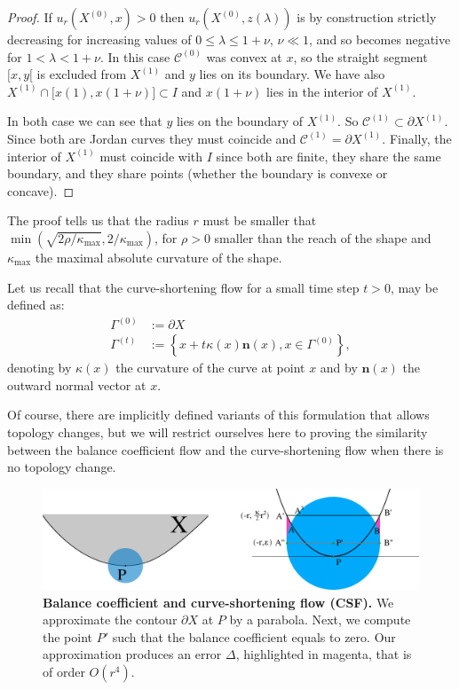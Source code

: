 \documentclass{siamart220329}
\newcommand{\C}{\mathcal{C}} %
\begin{document}
\begin{proof}
  If $u_r(X^{(0)},x)>0$ then $u_r(X^{(0)},z(\lambda))$ is by
  construction strictly decreasing for increasing values of $0 \le
  \lambda \le 1+\nu$, $\nu \ll 1$, and so becomes negative for
  $1<\lambda < 1 + \nu$.  In this case $\C^{(0)}$ was convex at $x$,
  so the straight segment $\lbrack x,y \lbrack$ is excluded from
  $X^{(1)}$ and $y$ lies on its boundary. We have also $X^{(1)}
  \cap \lbrack x(1),x(1+\nu) \rbrack \subset I$ and $x(1+\nu)$ lies in
  the interior of $X^{(1)}$.

  In both case we can see that $y$ lies on the boundary of
  $X^{(1)}$. So $\C^{(1)} \subset \partial X^{(1)}$. Since both
  are Jordan curves they must coincide and $\C^{(1)} = \partial
  X^{(1)}$.  Finally, the interior of $X^{(1)}$ must coincide with
  $I$ since both are finite, they share the same boundary, and they
  share points (whether the boundary is convexe or concave).
\end{proof}

The proof tells us that the radius $r$ must be smaller that
$\min(\sqrt{2\rho / \kappa_{\max}},2 / \kappa_{\max})$, for $\rho>0$
smaller than the reach of the shape and $\kappa_{\max}$ the maximal
absolute curvature of the shape.

Let us recall that the curve-shortening flow for a small time step
$t>0$, may be defined as:
\begin{align}
  \Gamma^{(0)} & := \partial X \nonumber \\
  \Gamma^{(t)} & := \left\{ x + t\kappa(x)\mathbf{n}(x), x \in \Gamma^{(0)} \right\}, \label{eq-csf}
\end{align}
denoting by $\kappa(x)$ the curvature of the curve at point $x$
and by $\mathbf{n}(x)$ the outward normal vector at $x$.

Of course, there are implicitly defined variants of this formulation
that allows topology changes, but we will restrict ourselves here to
proving the similarity between the balance coefficient flow and the
curve-shortening flow when there is no topology change.


%
\begin{figure}
\center
\includegraphics[scale=0.75]{figures/analysis-error/geometry-argument.png}
\caption{\textbf{Balance coefficient and curve-shortening flow (CSF).} We
approximate the contour $\partial X$ at $P$ by a parabola. Next, we compute
the point $P'$ such that the balance coefficient equals to zero. Our
approximation produces an error $\Delta$, highlighted in magenta, that is of
order $O(r^4)$. \label{fig:geometric-argument}}
\end{figure}
%
\end{document}

